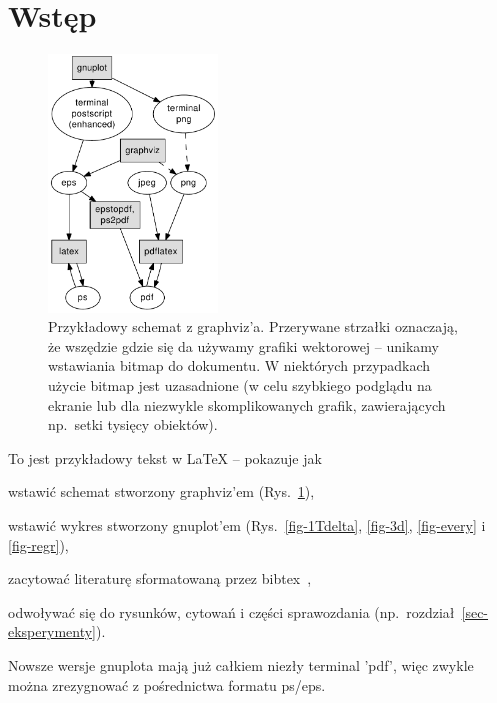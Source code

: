 \documentclass{article}
\begin{document}




\section{Wstęp}

\begin{figure}
\begin{center}
\includegraphics[width=0.4\textwidth]{rys_graf.pdf}
\end{center}
\caption{Przykładowy schemat z graphviz'a. Przerywane strzałki oznaczają, że wszędzie gdzie się da używamy grafiki wektorowej -- unikamy wstawiania bitmap do dokumentu. W niektórych przypadkach użycie bitmap jest uzasadnione (w celu szybkiego podglądu na ekranie lub dla niezwykle skomplikowanych grafik, zawierających np.~setki tysięcy obiektów).}
\label{fig-schemat}
\end{figure}


To jest przykładowy tekst w LaTeX -- pokazuje jak

\begin{tightlist}
\item wstawić schemat stworzony graphviz'em (Rys.~\ref{fig-schemat}),
\item wstawić wykres stworzony gnuplot'em (Rys.~\ref{fig-1Tdelta}, \ref{fig-3d}, \ref{fig-every} i \ref{fig-regr}),
\item zacytować literaturę sformatowaną przez bibtex~\cite{MiOIB,Goldberg-2002},
\item odwoływać się do rysunków, cytowań i części sprawozdania (np.\ rozdział~\ref{sec-eksperymenty}).
\end{tightlist}

Nowsze wersje gnuplota mają już całkiem niezły terminal 'pdf', więc zwykle można zrezygnować z pośrednictwa formatu ps/eps.
\end{document}
